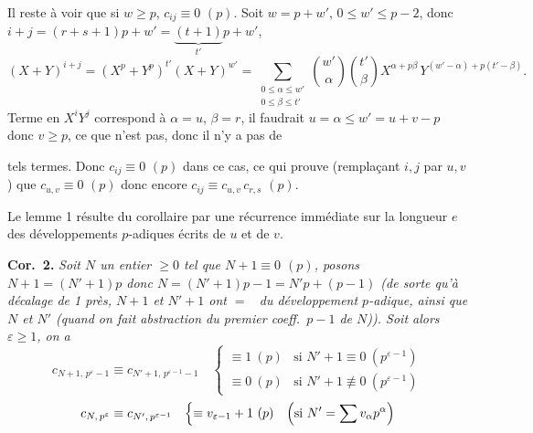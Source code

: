 \documentclass[11pt,a4paper]{article}
\begin{document}
Il reste à voir que si $w \geq p$,  $c_{ij} \equiv 0$ $(p)$.  Soit $w = p + w'$, $0 \leq w' \leq p-2$, donc $i + j = (r+s+1)p + w' = \underbrace{(t+1)}_{t'}p + w'$,
\[ (X+Y)^{i+j} = (X^p + Y^p)^{t'} (X+Y)^{w'} = \sum_{\substack{0 \leq \alpha \leq w' \\ 0 \leq \beta \leq t'}} \binom{w'}{\alpha} \binom{t'}{\beta} X^{\alpha + p\beta}\, Y^{(w'-\alpha) + p(t'-\beta)} . \]
Terme en $X^i Y^j$ correspond à $\alpha = u$, $\beta = r$, il faudrait $u = \alpha \leq w' = u + v - p$ donc $v \geq p$, ce que n'est pas, donc il n'y a pas de

tels termes. Donc $c_{ij} \equiv 0$ $(p)$ dans ce cas, ce qui prouve (remplaçant $i, j$ par $u, v$) que $c_{u,v} \equiv 0$ $(p)$ donc encore $c_{ij} \equiv c_{u,v}\, c_{r,s}$ $(p)$.

Le lemme 1 résulte du corollaire par une récurrence immédiate sur la longueur $e$ des développements $p$-adiques écrits de $u$ et de $v$.

\textbf{Cor.\ 2.} \emph{Soit $N$ un entier $\geq 0$ tel que $N + 1 \equiv 0$ $(p)$, posons $N + 1 = (N'+1)p$ donc $N = (N'+1)p - 1 = N'p + (p-1)$ (de sorte qu'à décalage de 1 près,  $N+1$ et $N'+1$ ont $=$ \ du développement $p$-adique, ainsi que $N$ et $N'$ (quand on fait abstraction du premier coeff.\ $p-1$ de $N$)). Soit alors $\varepsilon \geq 1$, on a}
\[ c_{N+1,\, p^\varepsilon - 1} \equiv c_{N'+1,\, p^{\varepsilon-1} - 1} \quad \begin{cases} \equiv 1 \ (p) & \text{si } N'+1 \equiv 0 \ (p^{\varepsilon-1}) \\ \equiv 0 \ (p) & \text{si } N'+1 \not\equiv 0 \ (p^{\varepsilon-1}) \end{cases} \]
\[ c_{N,\, p^\varepsilon} \equiv c_{N',\, p^{\varepsilon-1}} \quad \Bigl\{ \equiv v_{\varepsilon-1} + 1 \ (p) \quad \Bigl(\text{si } N' = \sum v_\alpha p^\alpha\Bigr) \]
\end{document}
